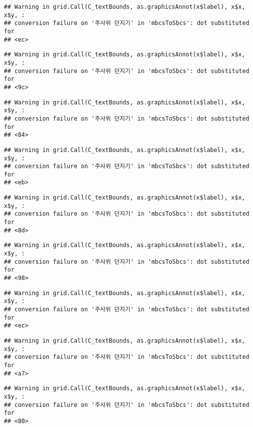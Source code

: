 \documentclass[]{book}
\begin{document}
\begin{verbatim}
## Warning in grid.Call(C_textBounds, as.graphicsAnnot(x$label), x$x, x$y, :
## conversion failure on '주사위 던지기' in 'mbcsToSbcs': dot substituted for
## <ec>
\end{verbatim}

\begin{verbatim}
## Warning in grid.Call(C_textBounds, as.graphicsAnnot(x$label), x$x, x$y, :
## conversion failure on '주사위 던지기' in 'mbcsToSbcs': dot substituted for
## <9c>
\end{verbatim}

\begin{verbatim}
## Warning in grid.Call(C_textBounds, as.graphicsAnnot(x$label), x$x, x$y, :
## conversion failure on '주사위 던지기' in 'mbcsToSbcs': dot substituted for
## <84>
\end{verbatim}

\begin{verbatim}
## Warning in grid.Call(C_textBounds, as.graphicsAnnot(x$label), x$x, x$y, :
## conversion failure on '주사위 던지기' in 'mbcsToSbcs': dot substituted for
## <eb>
\end{verbatim}

\begin{verbatim}
## Warning in grid.Call(C_textBounds, as.graphicsAnnot(x$label), x$x, x$y, :
## conversion failure on '주사위 던지기' in 'mbcsToSbcs': dot substituted for
## <8d>
\end{verbatim}

\begin{verbatim}
## Warning in grid.Call(C_textBounds, as.graphicsAnnot(x$label), x$x, x$y, :
## conversion failure on '주사위 던지기' in 'mbcsToSbcs': dot substituted for
## <98>
\end{verbatim}

\begin{verbatim}
## Warning in grid.Call(C_textBounds, as.graphicsAnnot(x$label), x$x, x$y, :
## conversion failure on '주사위 던지기' in 'mbcsToSbcs': dot substituted for
## <ec>
\end{verbatim}

\begin{verbatim}
## Warning in grid.Call(C_textBounds, as.graphicsAnnot(x$label), x$x, x$y, :
## conversion failure on '주사위 던지기' in 'mbcsToSbcs': dot substituted for
## <a7>
\end{verbatim}

\begin{verbatim}
## Warning in grid.Call(C_textBounds, as.graphicsAnnot(x$label), x$x, x$y, :
## conversion failure on '주사위 던지기' in 'mbcsToSbcs': dot substituted for
## <80>
\end{verbatim}
\end{document}
